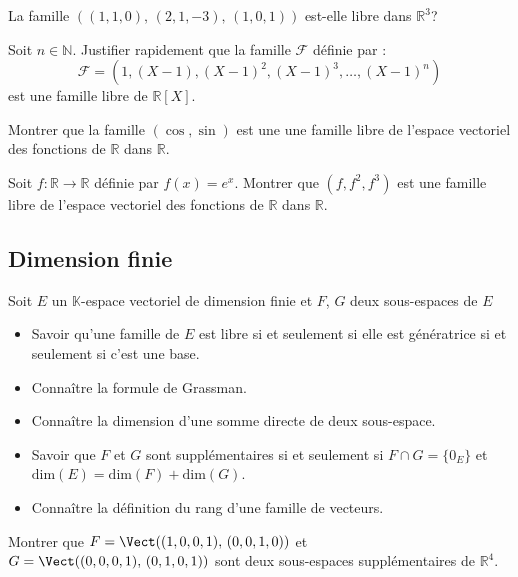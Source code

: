 \documentclass[a4paper,twoside,french,11pt]{VcCours}
\begin{document}
\begin{Exercice}{}
  La famille $((1,1,0), \, (2,1,-3), \, (1,0,1))$ est-elle libre dans $\mathbb{R}^3$?
\end{Exercice} 

\begin{Exercice}{}
  Soit $n \in \mathbb{N}$. Justifier rapidement que la famille $\mathcal{F}$ définie par :
  $$ \mathcal{F} = (1, (X-1), (X-1)^2, (X-1)^3, \ldots, (X-1)^n)$$
  est une famille libre de $\mathbb{R}[X]$.
\end{Exercice} 
  
\begin{Exercice}{}
  Montrer que la famille $(\cos, \sin)$ est une une famille libre de l'espace vectoriel des fonctions de $\mathbb{R}$ dans $\mathbb{R}$.
\end{Exercice} 

\begin{Exercice}{}
  Soit $f : \mathbb{R} \rightarrow \mathbb{R}$ définie par $f(x)=e^x$. Montrer que $(f,f^2,f^3)$ est une famille libre de l'espace vectoriel des fonctions de $\mathbb{R}$ dans $\mathbb{R}$.
\end{Exercice} 

\subsection{Dimension finie}

\begin{ptc}{}
	Soit $E$ un $\mathbb{K}$-espace vectoriel de dimension finie et $F$, $G$ deux sous-espaces de $E$
\begin{itemize}
\item Savoir qu'une famille de $E$ est libre si et seulement si elle est génératrice si et seulement si c'est une base.
\item Connaître la formule de Grassman.
\item Connaître la dimension d'une somme directe de deux sous-espace.
\item Savoir que $F$ et $G$ sont supplémentaires si et seulement si $F \cap G = \lbrace 0_E \rbrace$ et $\textrm{dim}(E)= \textrm{dim}(F) + \textrm{dim}(G)$.
\item Connaître la définition du rang d'une famille de vecteurs.
\end{itemize}
\end{ptc}

\begin{Exercice}{}
Montrer que $F=\Vect((1,0,0,1), \, (0,0,1,0))$ et $G=\Vect((0,0,0,1), \, (0,1,0,1))$ sont deux sous-espaces supplémentaires de $\mathbb{R}^4$.
\end{Exercice} 
\end{document}
